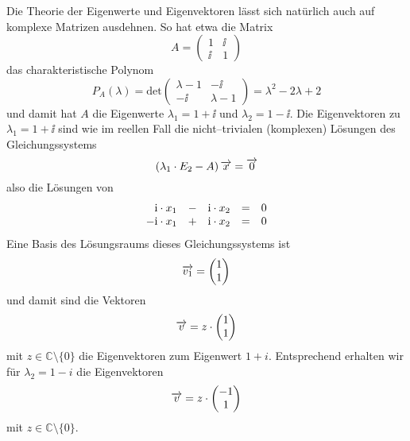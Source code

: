 \begin{notiz} Die Theorie der Eigenwerte und Eigenvektoren lässt sich natürlich auch 
auf komplexe Matrizen ausdehnen. So hat etwa die Matrix 
  	$$ A = \left( \begin{matrix} 1 & \ii \\ \ii & 1 \end{matrix} \right) $$
das charakteristische Polynom
  	$$ P_A(\lambda) = \mathrm{det} \left(\begin{matrix} \lambda - 1 & -\ii \\ - \ii & \lambda -1 \end{matrix} \right) 
     	= \lambda ^2 - 2 \lambda + 2 $$
und damit hat $A$ die Eigenwerte $\lambda_1 = 1+\ii$ und $\lambda_2 = 1-\ii$. Die Eigenvektoren zu 
$\lambda_1 = 1+\ii$ sind wie im reellen Fall die nicht--trivialen (komplexen) Lösungen des Gleichungssystems
  	$$ \left( \lambda_1 \cdot E_2 - A \right) \overrightarrow{x} = \overrightarrow{0} $$
also die Lösungen von
  	$$ \begin{array} {r c r c l}
  	\ii  \cdot x_1 & - & \ii \cdot  x_2 & = & 0 \\ -\ii \cdot x_1 & + & \ii \cdot x_2 & = & 0 
  	\end{array} $$
Eine Basis des Lösungsraums dieses Gleichungssystems ist
  	$$ \overrightarrow{v_1} = \left(\begin{matrix}  1 \\ 1 \end{matrix} \right)$$
und damit sind die Vektoren 
  	$$ \overrightarrow{v} = z \cdot  \left(\begin{matrix}  1 \\ 1 \end{matrix} \right) $$
mit $z \in \mathbb C \setminus \{ 0 \}$ die Eigenvektoren zum Eigenwert $1+i$. Entsprechend erhalten wir 
für $\lambda_2 = 1-i$ die Eigenvektoren
  	$$ \overrightarrow{v} = z \cdot  \left(\begin{matrix}  -1 \\ 1 \end{matrix} \right)$$
mit $z \in \mathbb C \setminus \{ 0 \}$.


\end{notiz}
